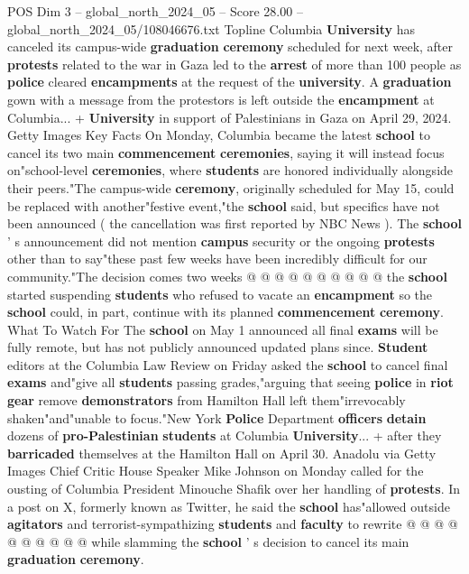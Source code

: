 \begin{textsample}{POS Dim 3 – global\_north\_2024\_05 – Score 28.00 – global\_north\_2024\_05/108046676.txt}  \label{ex:f3_pos_005}
Topline Columbia \textbf{University} has canceled its campus-wide \textbf{graduation} \textbf{ceremony} scheduled for next week, after \textbf{protests} related to the war in Gaza led to the \textbf{arrest} of more than 100 people as \textbf{police} cleared \textbf{encampments} at the request of the \textbf{university}.
A \textbf{graduation} gown with a message from the protestors is left outside the \textbf{encampment} at Columbia... + \textbf{University} in support of Palestinians in Gaza on April 29, 2024.
Getty Images Key Facts On Monday, Columbia became the latest \textbf{school} to cancel its two main \textbf{commencement} \textbf{ceremonies}, saying it will instead focus on"school-level \textbf{ceremonies}, where \textbf{students} are honored individually alongside their peers."The campus-wide \textbf{ceremony}, originally scheduled for May 15, could be replaced with another"festive event,"the \textbf{school} said, but specifics have not been announced ( the cancellation was first reported by NBC News ).
The \textbf{school} ' s announcement did not mention \textbf{campus} security or the ongoing \textbf{protests} other than to say"these past few weeks have been incredibly difficult for our community."The decision comes two weeks @ @ @ @ @ @ @ @ @ @ the \textbf{school} started suspending \textbf{students} who refused to vacate an \textbf{encampment} so the \textbf{school} could, in part, continue with its planned \textbf{commencement} \textbf{ceremony}.
What To Watch For The \textbf{school} on May 1 announced all final \textbf{exams} will be fully remote, but has not publicly announced updated plans since. \textbf{Student} editors at the Columbia Law Review on Friday asked the \textbf{school} to cancel final \textbf{exams} and"give all \textbf{students} passing grades,"arguing that seeing \textbf{police} in \textbf{riot} \textbf{gear} remove \textbf{demonstrators} from Hamilton Hall left them"irrevocably shaken"and"unable to focus."New York \textbf{Police} Department \textbf{officers} \textbf{detain} dozens of \textbf{pro-Palestinian} \textbf{students} at Columbia \textbf{University}... + after they \textbf{barricaded} themselves at the Hamilton Hall on April 30.
Anadolu via Getty Images Chief Critic House Speaker Mike Johnson on Monday called for the ousting of Columbia President Minouche Shafik over her handling of \textbf{protests}.
In a post on X, formerly known as Twitter, he said the \textbf{school} has"allowed outside \textbf{agitators} and terrorist-sympathizing \textbf{students} and \textbf{faculty} to rewrite @ @ @ @ @ @ @ @ @ @ while slamming the \textbf{school} ' s decision to cancel its main \textbf{graduation} \textbf{ceremony}.

\end{textsample}
